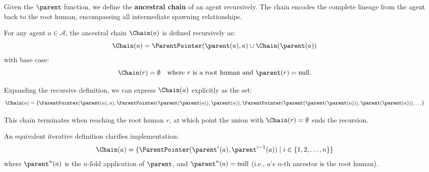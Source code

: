 Given the $\parent$ function, we define the \textbf{ancestral chain} of an agent recursively. The chain encodes the complete lineage from the agent back to the root human, encompassing all intermediate spawning relationships.

\begin{definition}
For any agent $a \in \mathcal{A}$, the ancestral chain $\Chain(a)$ is defined recursively as:
\begin{equation}
\Chain(a) = \ParentPointer(\parent(a), a) \cup \Chain(\parent(a))
\end{equation}
with base case:
\begin{equation}
\Chain(r) = \emptyset \quad \text{where } r \text{ is a root human and } \parent(r) = \text{null}.
\end{equation}
\end{definition}

Expanding the recursive definition, we can express $\Chain(a)$ explicitly as the set:
\begin{equation}
\Chain(a) = \{ \ParentPointer(\parent(a), a), \ParentPointer(\parent(\parent(a)), \parent(a)), \ParentPointer(\parent(\parent(\parent(a))), \parent(\parent(a))), \ldots \}
\end{equation}

This chain terminates when reaching the root human $r$, at which point the union with $\Chain(r) = \emptyset$ ends the recursion.

An equivalent iterative definition clarifies implementation:
\begin{equation}
\Chain(a) = \{ \ParentPointer(\parent^i(a), \parent^{i-1}(a)) \mid i \in \{1, 2, \ldots, n\} \}
\end{equation}
where $\parent^n(a)$ is the $n$-fold application of $\parent$, and $\parent^n(a) = \text{null}$ (i.e., $a$'s $n$-th ancestor is the root human).

